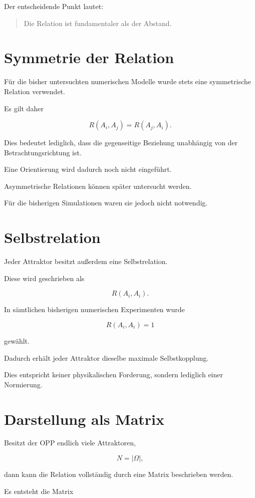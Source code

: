 Der entscheidende Punkt lautet:

\begin{quote}
Die Relation ist fundamentaler als der Abstand.
\end{quote}

\section{Symmetrie der Relation}

Für die bisher untersuchten numerischen Modelle wurde stets eine
symmetrische Relation verwendet.

Es gilt daher

\[
R(A_i,A_j)
=
R(A_j,A_i).
\]

Dies bedeutet lediglich, dass die gegenseitige Beziehung unabhängig von
der Betrachtungsrichtung ist.

Eine Orientierung wird dadurch noch nicht eingeführt.

Asymmetrische Relationen können später untersucht werden.

Für die bisherigen Simulationen waren sie jedoch nicht notwendig.

\section{Selbstrelation}

Jeder Attraktor besitzt außerdem eine Selbstrelation.

Diese wird geschrieben als

\[
R(A_i,A_i).
\]

In sämtlichen bisherigen numerischen Experimenten wurde

\[
R(A_i,A_i)=1
\]

gewählt.

Dadurch erhält jeder Attraktor dieselbe maximale Selbstkopplung.

Dies entspricht keiner physikalischen Forderung, sondern lediglich einer
Normierung.

\section{Darstellung als Matrix}

Besitzt der OPP endlich viele Attraktoren,

\[
N
=
|\Omega|,
\]

dann kann die Relation vollständig durch eine Matrix beschrieben werden.

Es entsteht die Matrix


